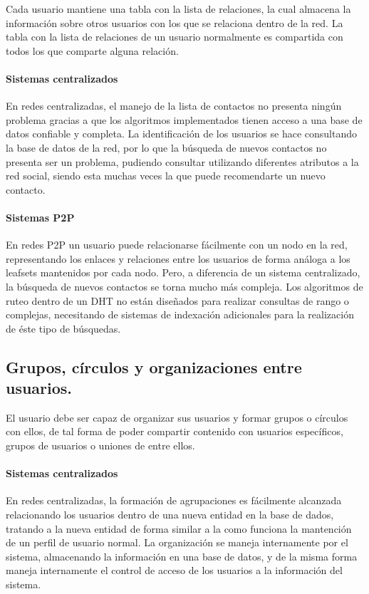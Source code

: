     Cada usuario mantiene una tabla con la lista de relaciones, la cual almacena la información
    sobre otros usuarios con los que se relaciona dentro de la red. La tabla con la
    lista de relaciones de un usuario normalmente es compartida con todos los que comparte
    alguna relación.
    
    \paragraph{Sistemas centralizados}
     En redes centralizadas, el manejo de la lista de contactos no
    presenta ningún problema gracias a que los algoritmos implementados tienen
    acceso a una base de datos confiable y completa.
    La identificación de los usuarios se hace consultando la base de datos de la
    red, por lo que la búsqueda de nuevos contactos no presenta ser un problema,
    pudiendo consultar utilizando diferentes atributos a la red social, siendo esta
    muchas veces la que puede recomendarte un nuevo contacto.
    
    \paragraph{Sistemas P2P}
     En redes P2P un usuario puede relacionarse fácilmente con un
    nodo en la red, representando los enlaces y relaciones entre los usuarios de
    forma análoga a los leafsets mantenidos por cada nodo. Pero, a diferencia de un
    sistema centralizado, la búsqueda de nuevos contactos se torna mucho más compleja.
    Los algoritmos de ruteo dentro de un DHT no están diseñados para realizar consultas de rango o
    complejas, necesitando de sistemas de indexación adicionales para la
    realización de éste tipo de búsquedas.

\subsection{Grupos, círculos y organizaciones entre usuarios.}
\label{sec:grupos}

    El usuario debe ser capaz de organizar sus usuarios y formar grupos o
    círculos con ellos, de tal forma de poder compartir contenido con usuarios
    específicos, grupos de usuarios o uniones de entre ellos.
    \paragraph{Sistemas centralizados}
     En redes centralizadas, la formación de agrupaciones es fácilmente alcanzada
    relacionando los usuarios dentro de una nueva entidad en la base de dados,
    tratando a la nueva entidad de forma similar a la como funciona la mantención
    de un perfil de usuario normal. La organización se maneja internamente por el
    sistema, almacenando la información en una base de datos, y de la misma forma
    maneja internamente el control de acceso de los usuarios a la información del sistema.


